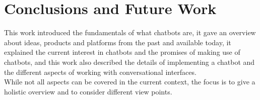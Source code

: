 \chapter{Conclusions and Future Work}


This work introduced the fundamentals of what chatbots are,
it gave an overview about ideas, products and platforms from the past and available today,
it explained the current interest in chatbots and the promises of making use of chatbots,
and this work also described the details of implementing a chatbot and the different aspects of working with conversational interfaces.
\\

While not all aspects can be covered in the current context,
the focus is to give a holistic overview and to consider different view points.
